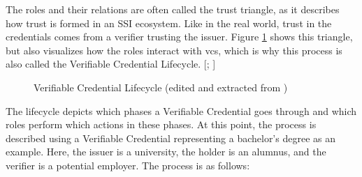         The roles and their relations are often called the trust triangle, as it describes how trust is formed in an \ac{SSI} ecosystem. Like in the real world, trust in the credentials comes from a verifier trusting the issuer. Figure \ref{figure: vc lifecycle} shows this triangle, but also visualizes how the roles interact with \acp{vc}, which is why this process is also called the Verifiable Credential Lifecycle. [\citealp[pp. 25-26]{preukschat_self-sovereign_2021}; \citealp{sporny_verifiable_2019}]
        
        \begin{figure}[htp]
    	    \centering
    	    \makebox[\textwidth]{}
            \caption[Verifiable Credential Lifecycle]{Verifiable Credential Lifecycle (edited and extracted from \cite{sporny_verifiable_2019})}
            \label{figure: vc lifecycle}
        \end{figure}
        
        The lifecycle depicts which phases a Verifiable Credential goes through and which roles perform which actions in these phases. At this point, the process is described using a Verifiable Credential representing a bachelor's degree as an example. Here, the issuer is a university, the holder is an alumnus, and the verifier is a potential employer. The process is as follows:  \cite{sporny_verifiable_2019}
        
